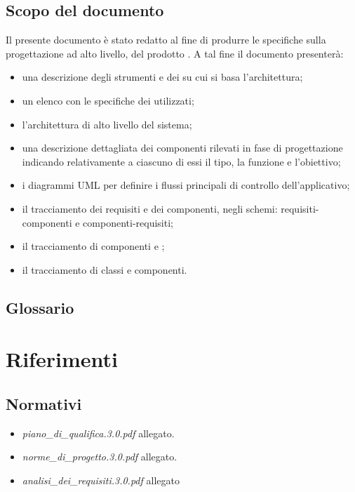 \subsection{Scopo del documento}
Il presente documento è stato redatto al fine di produrre le specifiche sulla progettazione ad alto livello, del prodotto \caName. A tal fine il documento presenterà:
\begin{itemize}
    \item una descrizione degli strumenti e dei \underline{} su cui si basa l'architettura;
	\item un elenco con le specifiche dei  utilizzati;
	\item l'architettura di alto livello del sistema;
	\item una descrizione dettagliata dei componenti rilevati in fase di progettazione indicando relativamente a ciascuno di essi il tipo, la funzione e l'obiettivo;
	\item i diagrammi UML per definire i flussi principali di controllo dell'applicativo;
	\item il tracciamento dei requisiti e dei componenti, negli schemi: requisiti-componenti e componenti-requisiti;
	\item il tracciamento di componenti e ;
	\item il tracciamento di classi e componenti.
\end{itemize}

\subsection{Glossario}
\glossaryIntro

\clearpage
\section{Riferimenti}

\subsection{Normativi}
\begin{itemize}
\item[] \textit{piano\_di\_qualifica.3.0.pdf} allegato.
\item[] \textit{norme\_di\_progetto.3.0.pdf} allegato.
\item[] \textit{analisi\_dei\_requisiti.3.0.pdf} allegato
\end{itemize}

